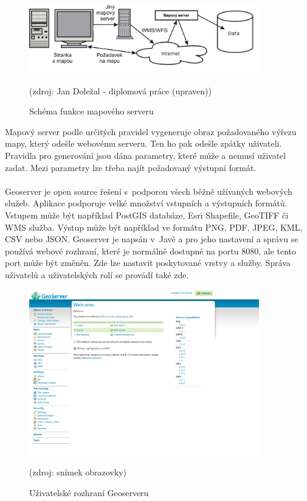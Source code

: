 \documentclass[11pt,a4paper,titlepage,oneside]{book}
\begin{document}
		\begin{figure}[!h]
			\begin{center}
				\includegraphics[width=10cm]{obrazky/mapserver.png}
				\caption{Schéma funkce mapového serveru}
				\label{fig:server_schema}
				(zdroj: Jan Doležal - diplomová práce\cite{dp_dolezal} (upraven))
			\end{center}
		\end{figure}
Mapový server podle určitých pravidel vygeneruje obraz požadovaného výřezu mapy, který odešle webovému serveru. Ten ho pak odešle zpátky uživateli. Pravidla pro generování jsou dána parametry, které může a nemusí uživatel zadat. Mezi parametry lze třeba najít požadovaný výstupní formát.




		\paragraph{} Geoserver je open source řešení s~podporou všech běžně užívaných webových služeb. Aplikace podporuje velké množství vstupních a výstupních formátů. Vstupem může být například PostGIS databáze, Esri Shapefile, GeoTIFF či \ac{WMS} služba. Výstup může být například ve formátu PNG, PDF, JPEG, KML, CSV nebo JSON.  Geoserver je napsán v~Javě a pro jeho nastavení a správu se používá webové rozhraní, které je normálně dostupné na portu 8080, ale tento port může být změněn. Zde lze nastavit poskytované vrstvy a služby. Správa uživatelů a uživatelských rolí se provádí také zde. 
		\begin{figure}[!h]
			\begin{center}
				\includegraphics[width=10cm]{obrazky/geoserver.png}
				\caption{Uživatelské rozhraní Geoserveru}
				(zdroj: snímek obrazovky)
			\end{center}
		\end{figure}
\end{document}

